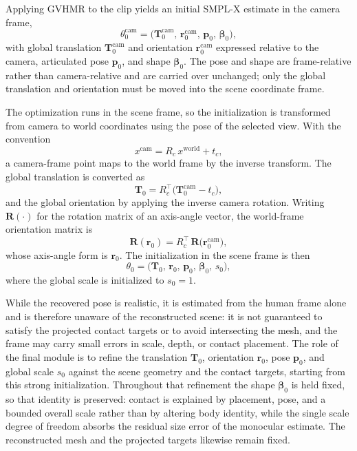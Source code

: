 Applying GVHMR to the clip yields an initial SMPL-X estimate in the camera frame,
\begin{equation}
\label{eq:gvhmr-camera-init}
\theta_0^{\mathrm{cam}} = \bigl( \mathbf{T}_0^{\mathrm{cam}},\, \mathbf{r}_0^{\mathrm{cam}},\, \mathbf{p}_0,\, \boldsymbol{\beta}_0 \bigr),
\end{equation}
with global translation $\mathbf{T}_0^{\mathrm{cam}}$ and orientation $\mathbf{r}_0^{\mathrm{cam}}$ expressed relative to the camera, articulated pose $\mathbf{p}_0$, and shape $\boldsymbol{\beta}_0$. The pose and shape are frame-relative rather than camera-relative and are carried over unchanged; only the global translation and orientation must be moved into the scene coordinate frame.

The optimization runs in the scene frame, so the initialization is transformed from camera to world coordinates using the pose of the selected view. With the convention
\begin{equation}
\label{eq:camera-transform-convention}
x^{\mathrm{cam}} = R_c\, x^{\mathrm{world}} + t_c,
\end{equation}
a camera-frame point maps to the world frame by the inverse transform. The global translation is converted as
\begin{equation}
\label{eq:init-translation-world}
\mathbf{T}_0 = R_c^{\top} \bigl( \mathbf{T}_0^{\mathrm{cam}} - t_c \bigr),
\end{equation}
and the global orientation by applying the inverse camera rotation. Writing $\mathbf{R}(\cdot)$ for the rotation matrix of an axis-angle vector, the world-frame orientation matrix is
\begin{equation}
\label{eq:init-orientation-world}
\mathbf{R}(\mathbf{r}_0) = R_c^{\top}\, \mathbf{R}\bigl( \mathbf{r}_0^{\mathrm{cam}} \bigr),
\end{equation}
whose axis-angle form is $\mathbf{r}_0$. The initialization in the scene frame is then
\begin{equation}
\label{eq:gvhmr-world-init}
\theta_0 = \bigl( \mathbf{T}_0,\, \mathbf{r}_0,\, \mathbf{p}_0,\, \boldsymbol{\beta}_0,\, s_0 \bigr),
\end{equation}
where the global scale is initialized to $s_0 = 1$.

While the recovered pose is realistic, it is estimated from the human frame alone and is therefore unaware of the reconstructed scene: it is not guaranteed to satisfy the projected contact targets or to avoid intersecting the mesh, and the frame may carry small errors in scale, depth, or contact placement. The role of the final module is to refine the translation $\mathbf{T}_0$, orientation $\mathbf{r}_0$, pose $\mathbf{p}_0$, and global scale $s_0$ against the scene geometry and the contact targets, starting from this strong initialization. Throughout that refinement the shape $\boldsymbol{\beta}_0$ is held fixed, so that identity is preserved: contact is explained by placement, pose, and a bounded overall scale rather than by altering body identity, while the single scale degree of freedom absorbs the residual size error of the monocular estimate. The reconstructed mesh and the projected targets likewise remain fixed.

